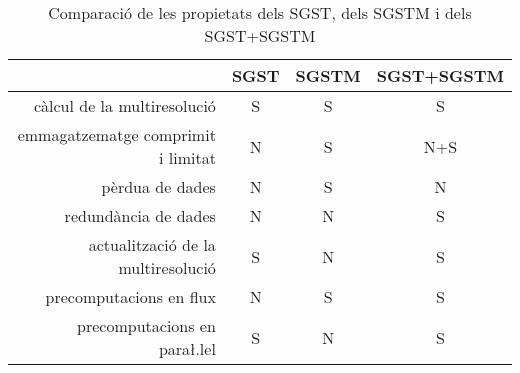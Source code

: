 \begin{table}[tp]
  \centering
  \begin{tabular}[c]{r|ccc}
  & \gls{SGST} & \gls{SGSTM} & \gls{SGST}+\gls{SGSTM}\\\hline
  càlcul de la multiresolució & S & S & S \\
  emmagatzematge comprimit i limitat & N & S & N+S\\
  pèrdua de dades & N & S & N\\
  redundància de dades & N & N & S\\ 
  actualització de la multiresolució & S & N & S\\
  precomputacions en flux & N & S & S\\
  precomputacions en para\l.lel & S & N & S\\
\end{tabular}
  \caption{Comparació de les propietats dels \gls{SGST}, dels \gls{SGSTM} i dels \gls{SGST}+\gls{SGSTM}}
  \label{fig:multiresolucio:comparacio-propietats}
\end{table}













